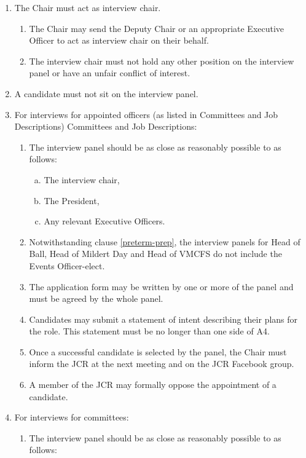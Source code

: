 \documentclass[12pt]{article}
\begin{document}
\begin{enumerate}
    \item The Chair must act as interview chair.
    \begin{enumerate}
        \item The Chair may send the Deputy Chair or an appropriate Executive Officer to act as interview chair on their behalf.
        \item The interview chair must not hold any other position on the interview panel or have an unfair conflict of interest.
    \end{enumerate}
    \item A candidate must not sit on the interview panel.
    \item For interviews for appointed officers (as listed in Committees and Job Descriptions) Committees and Job Descriptions:
    \begin{enumerate}
        \item The interview panel should be as close as reasonably possible to as follows:
        \begin{enumerate}[(a)]
            \item The interview chair,
            \item The President,
            \item Any relevant Executive Officers.
        \end{enumerate}
        \item Notwithstanding clause \ref{preterm-prep}, the interview panels for Head of Ball, Head of Mildert Day and Head of VMCFS do not include the Events Officer-elect.
        \item The application form may be written by one or more of the panel and must be agreed by the whole panel.
        \item Candidates may submit a statement of intent describing their plans for the role. This statement must be no longer than one side of A4.
        \item Once a successful candidate is selected by the panel, the Chair must inform the JCR at the next meeting and on the JCR Facebook group.
        \item A member of the JCR may formally oppose the appointment of a candidate.
    \end{enumerate}
    \item For interviews for committees:
    \begin{enumerate}
        \item The interview panel should be as close as reasonably possible to as follows:
        \begin{enumerate}[(a)]

\end{enumerate}
\end{enumerate}
\end{enumerate}
\end{document}

